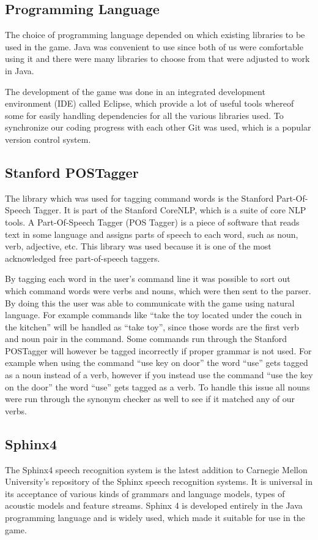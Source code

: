 \subsection{Programming Language}
The choice of programming language depended on which existing libraries to be used in the game. Java was convenient to use since both of us were comfortable using it and there were many libraries to choose from that were adjusted to work in Java.

The development of the game was done in an integrated development environment (IDE) called Eclipse, which provide a lot of useful tools whereof some for easily handling dependencies for all the various libraries used. To synchronize our coding progress with each other Git was used, which is a popular version control system.

\subsection{Stanford POSTagger} \label{sec:postagger}
The library which was used for tagging command words is the Stanford Part-Of-Speech Tagger. It is part of the Stanford CoreNLP, which is a suite of core NLP tools. A Part-Of-Speech Tagger (POS Tagger) is a piece of software that reads text in some language and assigns parts of speech to each word, such as noun, verb, adjective, etc. \citep{POSTagger} This library was used because it is one of the most acknowledged free part-of-speech taggers.

By tagging each word in the user's command line it was possible to sort out which command words were verbs and nouns, which were then sent to the parser. By doing this the user was able to communicate with the game using natural language. For example commands like ``take the toy located under the couch in the kitchen'' will be handled as ``take toy'', since those words are the first verb and noun pair in the command. Some commands run through the Stanford POSTagger will however be tagged incorrectly if proper grammar is not used. For example when using the command ``use key on door'' the word ``use'' gets tagged as a noun instead of a verb, however if you instead use the command ``use the key on the door'' the word ``use'' gets tagged as a verb. To handle this issue all nouns were run through the synonym checker as well to see if it matched any of our verbs.

\subsection{Sphinx4} \label{sec:sphinx4}
The Sphinx4 speech recognition system is the latest addition to Carnegie Mellon University's repository of the Sphinx speech recognition systems. It is universal in its acceptance of various kinds of grammars and language models, types of acoustic models and feature streams. Sphinx 4 is developed entirely in the Java programming language and is widely used, which made it suitable for use in the game. \citep{Sphinx4}

